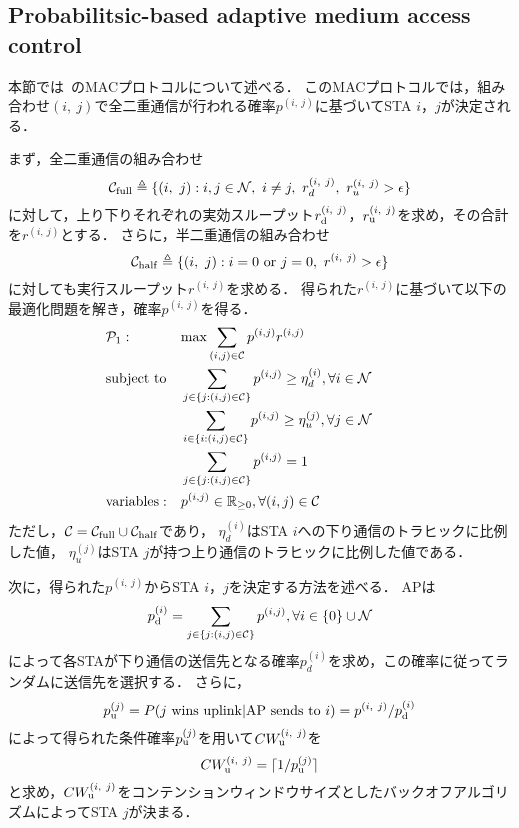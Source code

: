 \documentclass[technicalreport]{ieicej}
\newcommand{\sij}{(i,\ j)}
\newcommand{\pij}{p^{(i,\ j)}}
\newcommand{\rd}{r^{\sij}_{\rm d}}
\newcommand{\ru}{r^{\sij}_{\rm u}}
\newcommand{\rij}{r^{\sij}}
\begin{document}
	\subsection{Probabilitsic-based adaptive medium access control}
		本節では~\cite{promac}のMACプロトコルについて述べる．
		このMACプロトコルでは，組み合わせ$\sij$で全二重通信が行われる確率$\pij$に基づいてSTA $i$，$j$が決定される．
		\par
		まず，全二重通信の組み合わせ
		\begin{equation}
		{\mathcal C}_{\rm full} \triangleq \{\sij : i,j\in{\mathcal N},\ i\neq j,\ r^{\sij}_d,\ r^{\sij}_u>\epsilon\}
		\end{equation}
		に対して，上り下りそれぞれの実効スループット$\rd$，$\ru$を求め，その合計を$\rij$とする．
		さらに，半二重通信の組み合わせ
		\begin{equation}
			{\mathcal C}_{\rm half} \triangleq \{\sij : i=0\ {\rm or}\ j=0,\ \rij >\epsilon\}
		\end{equation}
		に対しても実行スループット$\rij$を求める．
		得られた$\rij$に基づいて以下の最適化問題を解き，確率$\pij$を得る．
		\begin{align}
			&{\mathcal P}_1: && {\rm max} \sum_{(i,j)\in{\mathcal C}} p^{(i,j)}r^{(i,j)} &&&&&& \label{eq:p1}\\
			&{\rm subject\ to} && \sum_{j\in\{j:(i,j)\in{\mathcal C}\}} p^{(i,j)} \geq \eta_d^{(i)}, \forall i\in {\mathcal N}  \\
			&&& \sum_{i\in\{i:(i,j)\in{\mathcal C}\}} p^{(i,j)} \geq \eta_u^{(j)}, \forall j\in {\mathcal N}  \\
			&&& \sum_{j\in\{j:(i,j)\in{\mathcal C}\}} p^{(i,j)}=1 \\
			&{\rm variables:} &&p^{(i,j)} \in {\mathbb R}_{\geq 0},\forall(i,j)\in {\mathcal C}
		\end{align}
		ただし，${\mathcal C} = {\mathcal C}_{\rm full} \cup {\mathcal C}_{\rm half}$であり，
		$\eta_d^{(i)}$はSTA $i$への下り通信のトラヒックに比例した値，
		$\eta_u^{(j)}$はSTA $j$が持つ上り通信のトラヒックに比例した値である．
		\par
		次に，得られた$\pij$からSTA $i$，$j$を決定する方法を述べる．
		APは
		\begin{equation}
			p_{\rm d}^{(i)}= \sum_{j\in\{j:(i,j)\in{\mathcal C}\}}p^{(i,j)},\forall i \in \{0\}\cup{\mathcal N}
		\end{equation}
		によって各STAが下り通信の送信先となる確率$p_d^{(i)}$を求め，この確率に従ってランダムに送信先を選択する．
		さらに，
		\begin{equation}
			p_{\rm u}^{(j)} = P(j\ {\rm wins\ uplink|AP\ sends\ to}\ i)=\pij / p_{\rm d}^{(i)}
		\end{equation}
		によって得られた条件確率$p_{\rm u}^{(j)}$を用いて$CW^{\sij}_{\rm u}$を
		\begin{equation}
			CW^{\sij}_{\rm u} = \lceil 1/p_{\rm u}^{(j)} \rceil
		\end{equation}
		と求め，$CW^{\sij}_{\rm u}$をコンテンションウィンドウサイズとしたバックオフアルゴリズムによってSTA $j$が決まる．
\end{document}
